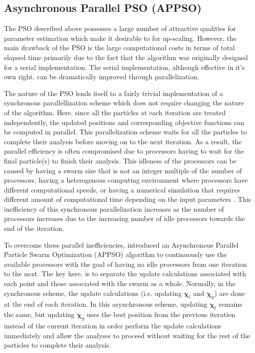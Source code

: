 \subsection{Asynchronous Parallel PSO (APPSO)}

The PSO described above possesses a large number of attractive qualities for parameter estimation which make it desirable to for up-scaling.  However, the main drawback of the PSO is the large computational costs in terms of total elapsed time primarily due to the fact that the algorithm was originally designed for a serial implementation. The serial implementation, although effective in it's own right, can be dramatically improved through parallelization. 

The nature of the PSO lends itself to a fairly trivial implementation of a synchronous parallellization scheme which does not require changing the nature of the algorithm. Here, since all the particles at each iteration are treated independently, the updated positions and corresponding objective functions can be computed in parallel. This parallelization scheme waits for all the particles to complete their analysis before moving on to the next iteration. As a result, the parallel efficiency is often compromised due to processors having to wait for the final particle(s) to finish their analysis. This idleness of the processors can be caused by having a swarm size that is not an integer multiple of the number of processors, having a heterogenous computing environment where processors have different computational speeds, or having a numerical simulation that requires different amount of computational time depending on the input parameters \citep{Venter_2006}. This inefficiency of this synchronous parallelization increases as the number of processors increases due to the increasing number of idle processors towards the end of the iteration.

To overcome these parallel inefficiencies, \citet{Venter_2006} introduced an Asynchronous Parallel Particle Swarm Optimization (APPSO) algorithm to continuously use the available processors with the goal of having no idle processors from one iteration to the next. The key here, is to separate the update calculations associated with each point and those associated with the swarm as a whole. Normally, in the synchronous scheme, the update calculations (i.e. updating $\boldsymbol{\chi}_l$ and $\boldsymbol{\chi}_g$) are done at the end of each iteration. In this asynchronous scheme, updating $\boldsymbol{\chi}_l$ remains the same, but updating $\boldsymbol{\chi}_g$ uses the best position from the previous iteration instead of the current iteration in order perform the update calculations immediately and allow the analyses to proceed without waiting for the rest of the particles to complete their analysis.

